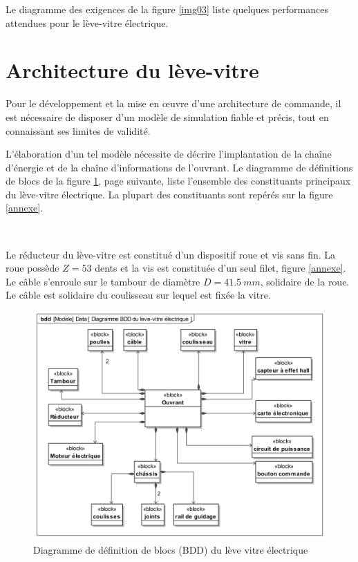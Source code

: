 Le diagramme des exigences de la figure \ref{img03} liste quelques performances attendues pour le lève-vitre électrique. 

\section{Architecture du lève-vitre}

Pour le développement et la mise en œuvre d'une architecture de commande, il est nécessaire de disposer d'un modèle de simulation fiable et précis, tout en connaissant ses limites de validité. 

L'élaboration d'un tel modèle nécessite de décrire l'implantation de la chaîne d'énergie et de la chaîne d'informations de l'ouvrant. 
Le diagramme de définitions de blocs de la figure \ref{img04}, page suivante, liste l'ensemble des constituants principaux du lève-vitre électrique. La plupart des constituants sont repérés sur la figure \ref{annexe}. 


~\

Le réducteur du lève-vitre est constitué d'un dispositif roue et vis sans fin. La roue possède $Z =53$ dents et la vis est constituée d'un seul filet, figure \ref{annexe}.  Le câble s'enroule sur le tambour de diamètre $D=41.5\ mm$, solidaire de la roue. Le câble est solidaire du coulisseau sur lequel est fixée la vitre. 

\begin{figure}[!h]
\centering\includegraphics[width=0.75\linewidth]{img/figure04}
 \caption{Diagramme de définition de blocs (BDD) du lève vitre électrique}
 \label{img04}
\end{figure}

